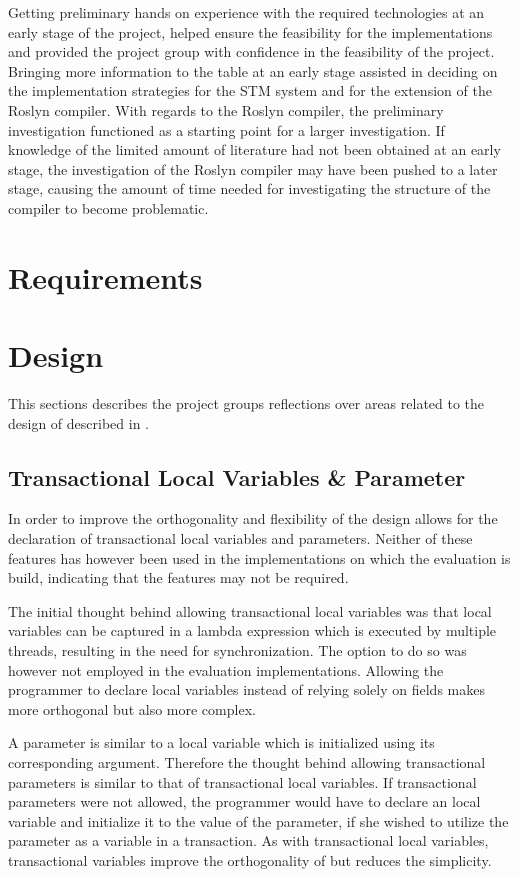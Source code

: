 Getting preliminary hands on experience with the required technologies at an early stage of the project, helped ensure the feasibility for the implementations and provided the project group with confidence in the feasibility of the project. Bringing more information to the table at an early stage assisted in deciding on the implementation strategies for the \ac{STM} system and for the extension of the Roslyn compiler. With regards to the Roslyn compiler, the preliminary investigation functioned as a starting point for a larger investigation. If knowledge of the limited amount of literature had not been obtained at an early stage, the investigation of the Roslyn compiler may have been pushed to a later stage, causing the amount of time needed for investigating the structure of the compiler to become problematic.

\section{Requirements}
\section{Design}\label{sec:reflection_design}
This sections describes the project groups reflections over areas related to the design of \stmname described in . 

\subsection{Transactional Local Variables \& Parameter}
In order to improve the orthogonality and flexibility of \stmname the design allows for the declaration of transactional local variables and parameters. Neither of these features has however been used in the implementations on which the evaluation is build, indicating that the features may not be required. 

The initial thought behind allowing transactional local variables was that local variables can be captured in a lambda expression which is executed by multiple threads, resulting in the need for synchronization. The option to do so was however not employed in the evaluation implementations. Allowing the programmer to declare  local variables instead of relying solely on  fields makes \stmnamesp more orthogonal but also more complex.

A parameter is similar to a local variable which is initialized using its corresponding argument\cite[p. 76]{sestoft2011c}. Therefore the thought behind allowing transactional parameters is similar to that of transactional local variables. If transactional parameters were not allowed, the programmer would have to declare an  local variable and initialize it to the value of the parameter, if she wished to utilize the parameter as a variable in a transaction. As with transactional local variables, transactional variables improve the orthogonality of \stmname but reduces the simplicity.

